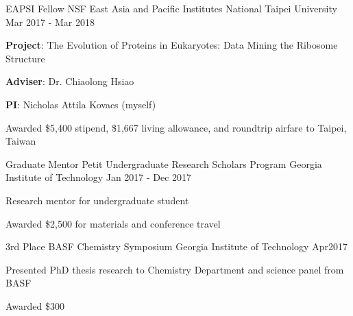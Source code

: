 

\begin{cventries}

  \cventry
    {EAPSI Fellow} %
    {NSF East Asia and Pacific Institutes} %
    {National Taipei University} %
    {Mar 2017 - Mar 2018} %
    {
      \begin{cvitems} %
        \item {{\bf Project}: The Evolution of Proteins in Eukaryotes: Data Mining the Ribosome Structure}
        \item {{\bf Adviser}: Dr. Chiaolong Hsiao}
        \item {{\bf PI}: Nicholas Attila Kovacs (myself)}
        \item {Awarded \$5,400 stipend, \$1,667 living allowance, and roundtrip airfare to Taipei, Taiwan}
      \end{cvitems}
    }

  \cventry
    {Graduate Mentor} %
    {Petit Undergraduate Research Scholars Program} %
    {Georgia Institute of Technology} %
    {Jan 2017 - Dec 2017} %
    {
      \begin{cvitems} %
        \item {Research mentor for undergraduate student}
        \item {Awarded \$2,500 for materials and conference travel}
      \end{cvitems}
    }

  \cventry
    {3rd Place} %
    {BASF Chemistry Symposium} %
    {Georgia Institute of Technology} %
    {Apr2017} %
    {
      \begin{cvitems} %
      	\item {Presented PhD thesis research to Chemistry Department and science panel from BASF}
        \item {Awarded \$300}
      \end{cvitems}
    }

\end{cventries}
